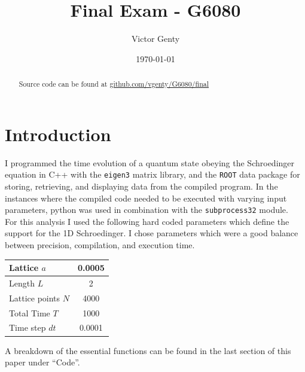 \documentclass[singlepage,notitlepage,nofootinbib,11pt]{revtex4-1}
\begin{document}
\title{Final Exam - G6080}
\author{Victor Genty}
\date{\today}
\begin{abstract}
\centering
Source code can be found at \href{https://github.com/vgenty/G6080/tree/master/final}{github.com/vgenty/G6080/final}
\end{abstract}
\maketitle
\section*{Introduction}
I programmed the time evolution of a quantum state obeying the Schroedinger equation in C++ with the \texttt{eigen3} matrix library, and the \texttt{ROOT} data package for storing, retrieving, and displaying data from the compiled program. In the instances where the compiled code needed to be executed with varying input parameters, python was used in combination with the \texttt{subprocess32} module.\\
\indent For this analysis I used the following hard coded parameters which define the support for the 1D Schroedinger. I chose parameters which were a good balance between precision, compilation, and execution time.
\begin{center}
  \begin{tabular}{| l | c |}\hline
    Lattice $a$ & 0.0005 \\\hline
    Length $L$  & 2 \\\hline
    Lattice points $N$ & 4000\\ \hline
    Total Time $T$ & 1000 \\ \hline
    Time step $dt$ & 0.0001 \\ \hline
    \end{tabular}
\end{center}
\indent\indent A breakdown of the essential functions can be found in the last section of this paper under ``Code''.
\end{document}
